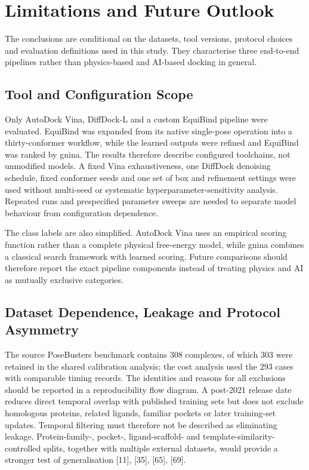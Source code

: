 \hypertarget{limitations-and-future-outlook}{%
\chapter{Limitations and Future Outlook}\label{limitations-and-future-outlook}}

The conclusions are conditional on the datasets, tool versions, protocol choices and evaluation definitions used in this study. They characterise three end-to-end pipelines rather than physics-based and AI-based docking in general.

\hypertarget{tool-and-configuration-scope}{%
\section{Tool and Configuration Scope}\label{tool-and-configuration-scope}}

Only AutoDock Vina, DiffDock-L and a custom EquiBind pipeline were evaluated. EquiBind was expanded from its native single-pose operation into a thirty-conformer workflow, while the learned outputs were refined and EquiBind was ranked by gnina. The results therefore describe configured toolchains, not unmodified models. A fixed Vina exhaustiveness, one DiffDock denoising schedule, fixed conformer seeds and one set of box and refinement settings were used without multi-seed or systematic hyperparameter-sensitivity analysis. Repeated runs and prespecified parameter sweeps are needed to separate model behaviour from configuration dependence.

The class labels are also simplified. AutoDock Vina uses an empirical scoring function rather than a complete physical free-energy model, while gnina combines a classical search framework with learned scoring. Future comparisons should therefore report the exact pipeline components instead of treating physics and AI as mutually exclusive categories.

\hypertarget{dataset-dependence-leakage-and-protocol-asymmetry}{%
\section{Dataset Dependence, Leakage and Protocol Asymmetry}\label{dataset-dependence-leakage-and-protocol-asymmetry}}

The source PoseBusters benchmark contains 308 complexes, of which 303 were retained in the shared calibration analysis; the cost analysis used the 293 cases with comparable timing records. The identities and reasons for all exclusions should be reported in a reproducibility flow diagram. A post-2021 release date reduces direct temporal overlap with published training sets but does not exclude homologous proteins, related ligands, familiar pockets or later training-set updates. Temporal filtering must therefore not be described as eliminating leakage. Protein-family-, pocket-, ligand-scaffold- and template-similarity-controlled splits, together with multiple external datasets, would provide a stronger test of generalisation {[}11{]}, {[}35{]}, {[}65{]}, {[}69{]}.

